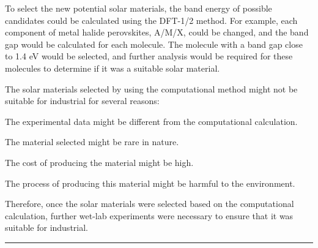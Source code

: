 \documentclass[twocolumn]{article} %
\let\tempthree\enumerate
\let\tempfour\endenumerate
\renewenvironment{enumerate}{\tempthree\setlength{\itemsep}{0pt}}{\tempfour}
\begin{document}
To select the new potential solar materials, the band energy of possible candidates could be calculated using the DFT-1/2 method. For example, each component of metal halide perovskites, A/M/X, could be changed, and the band gap would be calculated for each molecule. The molecule with a band gap close to 1.4 eV would be selected, and further analysis would be required for these molecules to determine if it was a suitable solar material. 

The solar materials selected by using the computational method might not be suitable for industrial for several reasons:

\begin{enumerate}

      \item The experimental data might be different from the computational calculation.

      \item The material selected might be rare in nature.

      \item The cost of producing the material might be high.

      \item The process of producing this material might be harmful to the environment. 
\end{enumerate}

Therefore, once the solar materials were selected based on the computational calculation, further wet-lab experiments were necessary to ensure that it was suitable for industrial. 









\vspace{8mm}
\hrule
\end{document}
